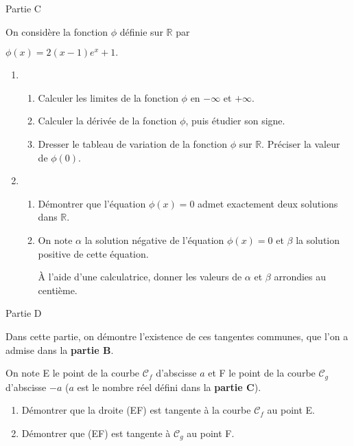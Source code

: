 \begin{h3}Partie C\end{h3}
On considère la fonction $\phi $ définie sur  $\mathbb{R}$ par
\begin{center}$\phi \left(x\right)=2\left(x -1\right)e^{x}+1.$\end{center}
\begin{enumerate}
     \item
     \begin{enumerate}[label=\alph*.]
          \item
          Calculer les limites de la fonction $\phi $ en $-\infty $ et $+ \infty $.
          \item
          Calculer la dérivée de la fonction $\phi $, puis étudier son signe.
          \item
     Dresser le tableau de variation de la fonction $\phi $ sur $\mathbb{R}$. Préciser la valeur de $\phi \left(0\right)$.\end{enumerate}
     \item
     \begin{enumerate}[label=\alph*.]
          \item
          Démontrer que l'équation $\phi \left(x\right)=0$ admet exactement deux solutions dans $\mathbb{R}$.
          \item
          On note $\alpha $ la solution négative de l'équation $\phi \left(x\right)=0$ et $\beta $ la solution positive de cette équation.
          \par
     À l'aide d'une calculatrice, donner les valeurs de $\alpha $ et $\beta $ arrondies au centième.\end{enumerate}
\end{enumerate}
\begin{h3}Partie D\end{h3}
Dans cette partie, on démontre l'existence de ces tangentes communes, que l'on a admise dans la \textbf{partie B}.
\par
On note E le point de la courbe $\mathscr C_{f}$ d'abscisse $a$ et F le point de la courbe $\mathscr C_{g}$ d'abscisse $-a$ ($a$ est le nombre réel défini dans la \textbf{partie C}).
\begin{enumerate}
     \item
     Démontrer que la droite (EF) est tangente à la courbe $\mathscr C_{f}$ au point E.
     \item
Démontrer que (EF) est tangente à $\mathscr C_{g}$ au point F. \end{enumerate}
